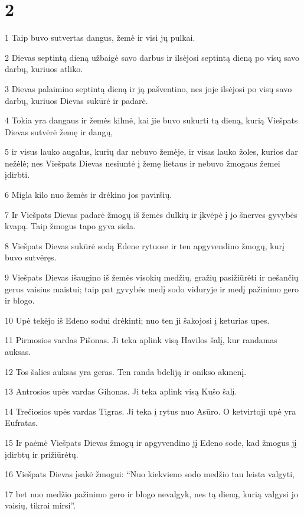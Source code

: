 \chapter{2}


\par 1 Taip buvo sutvertas dangus, žemė ir visi jų pulkai. 
\par 2 Dievas septintą dieną užbaigė savo darbus ir ilsėjosi septintą dieną po visų savo darbų, kuriuos atliko. 
\par 3 Dievas palaimino septintą dieną ir ją pašventino, nes joje ilsėjosi po visų savo darbų, kuriuos Dievas sukūrė ir padarė. 
\par 4 Tokia yra dangaus ir žemės kilmė, kai jie buvo sukurti tą dieną, kurią Viešpats Dievas sutvėrė žemę ir dangų, 
\par 5 ir visus lauko augalus, kurių dar nebuvo žemėje, ir visas lauko žoles, kurios dar nežėlė; nes Viešpats Dievas nesiuntė į žemę lietaus ir nebuvo žmogaus žemei įdirbti. 
\par 6 Migla kilo nuo žemės ir drėkino jos paviršių. 
\par 7 Ir Viešpats Dievas padarė žmogų iš žemės dulkių ir įkvėpė į jo šnerves gyvybės kvapą. Taip žmogus tapo gyva siela. 
\par 8 Viešpats Dievas sukūrė sodą Edene rytuose ir ten apgyvendino žmogų, kurį buvo sutvėręs. 
\par 9 Viešpats Dievas išaugino iš žemės visokių medžių, gražių pasižiūrėti ir nešančių gerus vaisius maistui; taip pat gyvybės medį sodo viduryje ir medį pažinimo gero ir blogo. 
\par 10 Upė tekėjo iš Edeno sodui drėkinti; nuo ten ji šakojosi į keturias upes. 
\par 11 Pirmosios vardas Pišonas. Ji teka aplink visą Havilos šalį, kur randamas auksas. 
\par 12 Tos šalies auksas yra geras. Ten randa bdeliją ir onikso akmenį. 
\par 13 Antrosios upės vardas Gihonas. Ji teka aplink visą Kušo šalį. 
\par 14 Trečiosios upės vardas Tigras. Ji teka į rytus nuo Asūro. O ketvirtoji upė yra Eufratas. 
\par 15 Ir paėmė Viešpats Dievas žmogų ir apgyvendino jį Edeno sode, kad žmogus jį įdirbtų ir prižiūrėtų. 
\par 16 Viešpats Dievas įsakė žmogui: “Nuo kiekvieno sodo medžio tau leista valgyti, 
\par 17 bet nuo medžio pažinimo gero ir blogo nevalgyk, nes tą dieną, kurią valgysi jo vaisių, tikrai mirsi”. 

